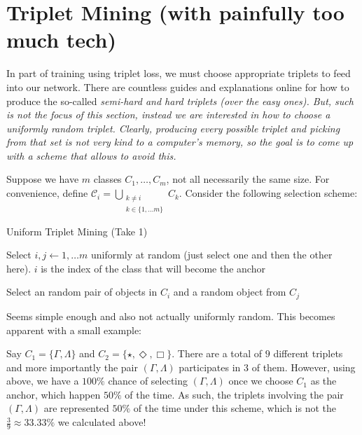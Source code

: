 \section{Triplet Mining (with painfully too much tech)}\label{Section:Triplet-Mining-with-too-much-tech}

In part of training using triplet loss, we must choose appropriate triplets to feed into our network.
There are countless guides and explanations online for how to produce the so-called \it{semi-hard} and \it{hard} triplets (over the \it{easy} ones).
But, such is not the focus of this section, instead we are interested in how to choose a uniformly random triplet.
Clearly, producing every possible triplet and picking from that set is not very kind to a computer's memory, so the goal is to come up with a scheme that allows to avoid this.

Suppose we have $m$ classes $C_1, \ldots, C_m$, not all necessarily the same size.
For convenience, define $\mathscr{C}_i = \bigcup_{\substack{k \neq i \\ k \in \{1, \ldots m\}}} C_k$.
Consider the following selection scheme:

\begin{algorithm}
    \caption{Uniform Triplet Mining (Take 1)}\label{Algorithm:appendix-triplet-mining:uniform-triplet-mining-take-one}

    \nl Select $i, j \longleftarrow {1, \ldots m}$ uniformly at random (just select one and then the other here). $i$ is the index of the class that will become the anchor

    \nl Select an random pair of objects in $C_i$ and a random object from $C_j$
\end{algorithm}

Seems simple enough and also not actually uniformly random.
This becomes apparent with a small example: 

\begin{changemargin}{1cm}{1cm}
Say $C_1 = \{\Gamma, \Lambda\}$ and $C_2 = \{\star, \Diamond, \Box\}$.
There are a total of $9$ different triplets and more importantly the pair $(\Gamma, \Lambda)$ participates in $3$ of them.
However, using  above, we have a $100\%$ chance of selecting $(\Gamma, \Lambda)$ once we choose $C_1$ as the anchor, which happen $50\%$ of the time.
As such, the triplets involving the pair $(\Gamma, \Lambda)$ are represented $50\%$ of the time under this scheme, which is not the $\frac{3}{9} \approx 33.33\%$ we calculated above!
\end{changemargin}

